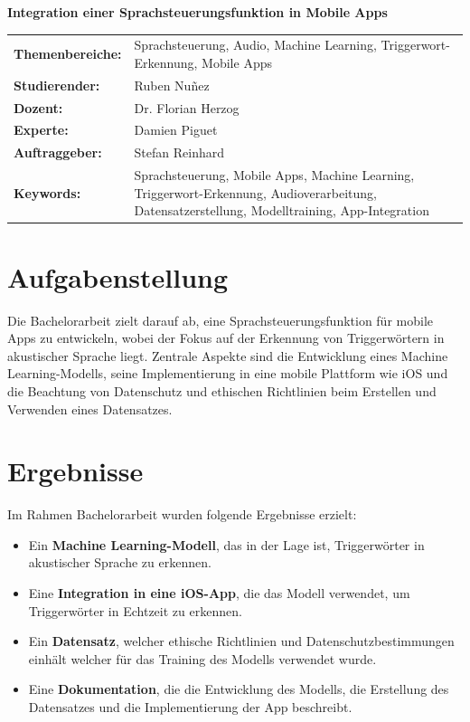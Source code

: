 \documentclass[11pt,a4paper]{article}
\newcommand{\titleformat}{\fontsize{18pt}{22pt}\selectfont}
\newcommand{\bodytextformat}{\fontsize{10pt}{12pt}\selectfont}
\begin{document}
\begin{flushleft}
    {\titleformat\textbf{Integration einer Sprachsteuerungsfunktion in Mobile Apps}}\\[0.5cm]
  \end{flushleft}

\bodytextformat

\noindent
\begin{tabularx}{\linewidth}{@{}p{4cm}X@{}}
    \textbf{Themenbereiche:} & Sprachsteuerung, Audio, Machine Learning, Triggerwort-Erkennung, Mobile Apps \\
    \textbf{Studierender:} & Ruben Nuñez \\
    \textbf{Dozent:} & Dr. Florian Herzog \\
    \textbf{Experte:} & Damien Piguet \\
    \textbf{Auftraggeber:} & Stefan Reinhard \\
    \textbf{Keywords:} & Sprachsteuerung, Mobile Apps, Machine Learning, Triggerwort-Erkennung, Audioverarbeitung, Datensatzerstellung, Modelltraining, App-Integration \\
\end{tabularx}
    




\section{Aufgabenstellung}
Die Bachelorarbeit zielt darauf ab, eine Sprachsteuerungsfunktion für mobile Apps zu entwickeln, wobei der Fokus auf der Erkennung von Triggerwörtern in akustischer Sprache liegt. Zentrale Aspekte sind die Entwicklung eines Machine Learning-Modells, seine Implementierung in eine mobile Plattform wie iOS und die Beachtung von Datenschutz und ethischen Richtlinien beim Erstellen und Verwenden eines Datensatzes.


\section{Ergebnisse}
Im Rahmen Bachelorarbeit wurden folgende Ergebnisse erzielt:

\begin{itemize}
    \itemsep0em
    \item Ein \textbf{Machine Learning-Modell}, das in der Lage ist, Triggerwörter in akustischer Sprache zu erkennen.
    \item Eine \textbf{Integration in eine iOS-App}, die das Modell verwendet, um Triggerwörter in Echtzeit zu erkennen.
    \item Ein \textbf{Datensatz}, welcher ethische Richtlinien und Datenschutzbestimmungen einhält welcher für das Training des Modells verwendet wurde.
    \item Eine \textbf{Dokumentation}, die die Entwicklung des Modells, die Erstellung des Datensatzes und die Implementierung der App beschreibt.
\end{itemize}
\end{document}
